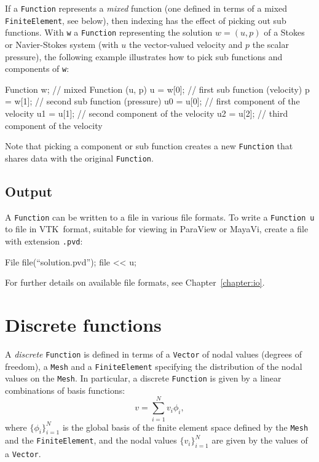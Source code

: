 If a \texttt{Function} represents a \emph{mixed} function (one defined in terms
of a mixed \texttt{FiniteElement}, see below), then indexing has the effect of
picking out sub functions. With \texttt{w} a \texttt{Function} representing the
solution $w = (u, p)$ of a Stokes or Navier-Stokes system (with $u$ the vector-valued
velocity and $p$ the scalar pressure), the following example illustrates how to
pick sub functions and components of \texttt{w}:
\begin{code}
  Function w; // mixed Function (u, p)
  u = w[0];   // first sub function (velocity)
  p = w[1];   // second sub function (pressure)
  u0 = u[0];  // first component of the velocity
  u1 = u[1];  // second component of the velocity
  u2 = u[2];  // third component of the velocity
\end{code}

Note that picking a component or sub function creates a new
\texttt{Function} that shares data with the original \texttt{Function}.

\subsection{Output}

A \texttt{Function} can be written to a file in various file formats.
To write a \texttt{Function}~\texttt{u} to file in VTK~format,
suitable for viewing in ParaView or MayaVi, create a file with
extension \texttt{.pvd}:
\begin{code}
  File file(``solution.pvd'');
  file << u;
\end{code}

For further details on available file formats, see
Chapter~\ref{chapter:io}.

\section{Discrete functions}

A \emph{discrete} \texttt{Function} is defined in terms of a \texttt{Vector} of nodal
values (degrees of freedom), a \texttt{Mesh} and
a \texttt{FiniteElement} specifying the distribution of the nodal values
on the \texttt{Mesh}. In particular, a discrete \texttt{Function}
is given by a linear combinations of basis functions:
\begin{equation}
  v = \sum_{i=1}^{N} v_i \phi_{i},
\end{equation}
where $\{\phi_i\}_{i=1}^N$ is the global basis of the finite element
space defined by the \texttt{Mesh} and the \texttt{FiniteElement}, and
the nodal values $\{v_i\}_{i=1}^N$ are given by the values of a
\texttt{Vector}.

